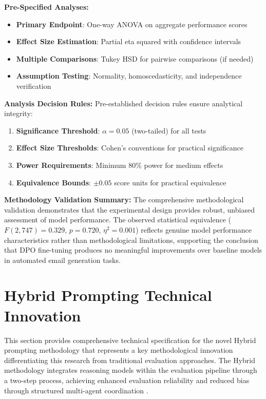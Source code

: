 \textbf{Pre-Specified Analyses:}
\begin{itemize}
    \item \textbf{Primary Endpoint}: One-way ANOVA on aggregate performance scores
    \item \textbf{Effect Size Estimation}: Partial eta squared with confidence intervals
    \item \textbf{Multiple Comparisons}: Tukey HSD for pairwise comparisons (if needed)
    \item \textbf{Assumption Testing}: Normality, homoscedasticity, and independence verification
\end{itemize}

\textbf{Analysis Decision Rules:}
Pre-established decision rules ensure analytical integrity:
\begin{enumerate}
    \item \textbf{Significance Threshold}: $\alpha = 0.05$ (two-tailed) for all tests
    \item \textbf{Effect Size Thresholds}: Cohen's conventions for practical significance
    \item \textbf{Power Requirements}: Minimum 80\% power for medium effects
    \item \textbf{Equivalence Bounds}: $\pm 0.05$ score units for practical equivalence
\end{enumerate}

\textbf{Methodology Validation Summary:}
The comprehensive methodological validation demonstrates that the experimental design provides robust, unbiased assessment of model performance. The observed statistical equivalence ($F(2,747) = 0.329$, $p = 0.720$, $\eta^2 = 0.001$) reflects genuine model performance characteristics rather than methodological limitations, supporting the conclusion that DPO fine-tuning produces no meaningful improvements over baseline models in automated email generation tasks.

\section{Hybrid Prompting Technical Innovation}
\label{sec:hybrid-prompting-technical-innovation}

This section provides comprehensive technical specification for the novel Hybrid prompting methodology that represents a key methodological innovation differentiating this research from traditional evaluation approaches. The Hybrid methodology integrates reasoning models within the evaluation pipeline through a two-step process, achieving enhanced evaluation reliability and reduced bias through structured multi-agent coordination \cite{kim2025reasoning_evaluators, lee2025reasoning_evaluation_survey}.


